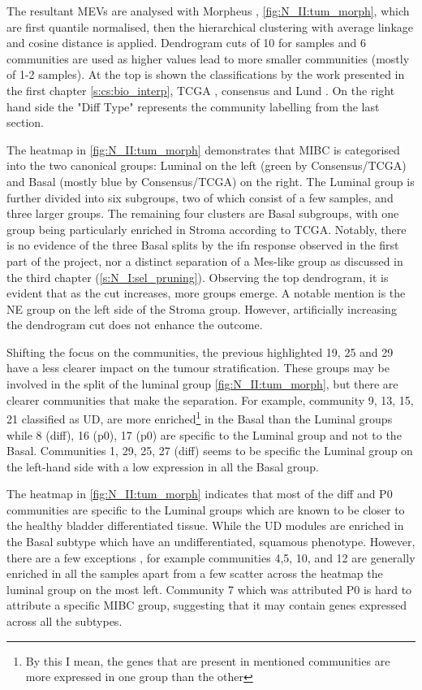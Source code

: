 The resultant MEVs are analysed with Morpheus \citet{Broad-InstituteUnknown-kn}, \cref{fig:N_II:tum_morph}, which are first quantile normalised, then the hierarchical clustering with average linkage and cosine distance is applied. Dendrogram cuts of 10 for samples and 6 communities are used as higher values lead to more smaller communities (mostly of 1-2 samples). At the top is shown the classifications by the work presented in the first chapter \cref{s:cs:bio_interp}, TCGA \citet{Robertson2017-mg}, consensus \citet{Kamoun2020-tj} and Lund \citet{Marzouka2018-ge}. On the right hand side the "Diff Type" represents the community labelling from the last section.

The heatmap in \cref{fig:N_II:tum_morph} demonstrates that MIBC is categorised into the two canonical groups: Luminal on the left (green by Consensus/TCGA) and Basal (mostly blue by Consensus/TCGA) on the right. The Luminal group is further divided into six subgroups, two of which consist of a few samples, and three larger groups. The remaining four clusters are Basal subgroups, with one group being particularly enriched in Stroma according to TCGA. Notably, there is no evidence of the three Basal splits by the \acrfull{ifn} response observed in the first part of the project, nor a distinct separation of a Mes-like group as discussed in the third chapter (\cref{s:N_I:sel_pruning}). Observing the top dendrogram, it is evident that as the cut increases, more groups emerge. A notable mention is the NE group on the left side of the Stroma group. However, artificially increasing the dendrogram cut does not enhance the outcome.

Shifting the focus on the communities, the previous highlighted 19, 25 and 29 have a less clearer impact on the tumour stratification. These groups may be involved in the split of the luminal group \cref{fig:N_II:tum_morph}, but there are clearer communities that make the separation. For example, community 9, 13, 15, 21 classified as UD, are more enriched\footnote{By this I mean, the genes that are present in mentioned communities are more expressed in one group than the other} in the Basal than the Luminal groups while 8 (diff), 16 (p0), 17 (p0) are specific to the Luminal group and not to the Basal. Communities 1, 29, 25, 27 (diff) seems to be specific the Luminal group on the left-hand side with a low expression in all the Basal group. 

The heatmap in \cref{fig:N_II:tum_morph} indicates that most of the diff and P0 communities are specific to the Luminal groups which are known to be closer to the healthy bladder differentiated tissue. While the UD modules are enriched in the Basal subtype which have an undifferentiated, squamous phenotype. However, there are a few exceptions , for example communities 4,5, 10, and 12 are generally enriched in all the samples apart from a few scatter across the heatmap the luminal group on the most left. Community 7 which was attributed P0 is hard to attribute a specific MIBC group, suggesting that it may contain genes expressed across all the subtypes.

